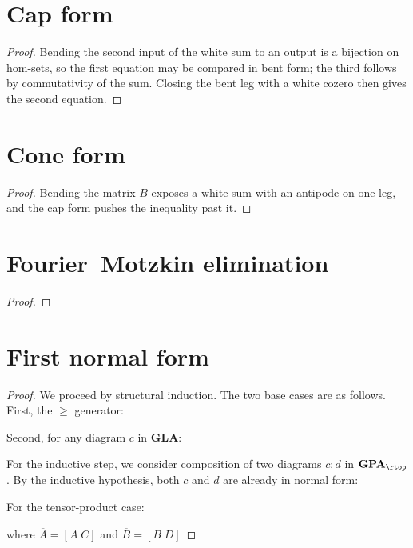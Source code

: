 \section{Cap form}\label{appendix:gpa-proof-2}

\begin{proof}
    Bending the second input of the white sum to an output is a bijection on
    hom-sets, so the first equation may be compared in bent form; the third
    follows by commutativity of the sum. Closing the bent leg with a white
    cozero then gives the second equation.
    
\end{proof}

\section{Cone form}\label{appendix:gpa-proof-3}

\begin{proof}
    Bending the matrix $B$ exposes a white sum with an antipode on one leg, and
    the cap form pushes the inequality past it.
    
\end{proof}

\section{Fourier--Motzkin elimination}\label{appendix:gpa-proof-4}

\begin{proof}
        
\end{proof}

\section{First normal form}\label{appendix:gpa-proof-5}

\begin{proof}
    We proceed by structural induction. The two base cases are as follows.
    First, the $\ge$ generator:
    

    \noindent Second, for any diagram $c$ in $\mathbf{GLA}$:
    

    \noindent
    For the inductive step, we consider composition of two diagrams
    $c; d$ in $\mathbf{GPA}_{\rtop}$. By the inductive hypothesis, both
    $c$ and $d$ are already in normal form:
    

    \noindent For the tensor-product case:
    

    \noindent where $\overline{A} = [A \; C]$ and $\overline{B} = [B \; D]$
\end{proof}

